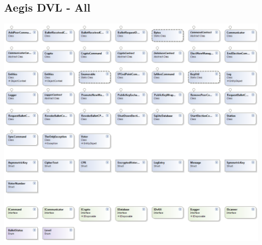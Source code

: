 \documentclass[a4paper]{report}
\begin{document}
\subsection*{ Aegis DVL - All}
\begin{center}
\includegraphics[width=\textwidth]{DVLClassdiagram_All.png}
\end{center}
\end{document}
